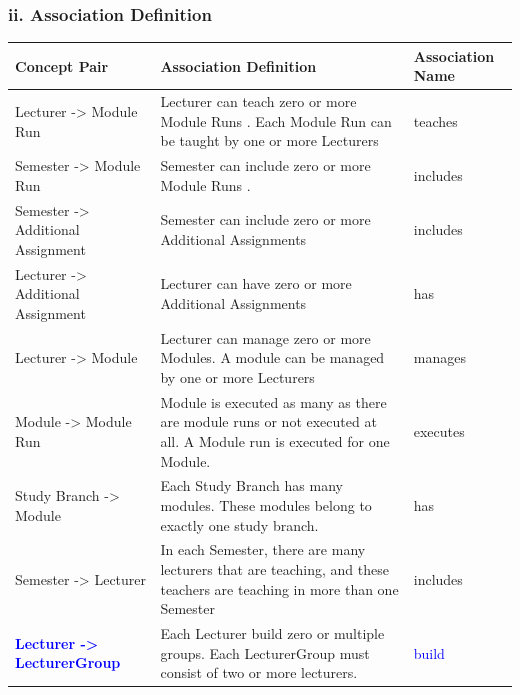 \documentclass{scrartcl}
\begin{document}
   
\subsubsection{ii. Association Definition}
	    \begin{table}[H]
\begin{center}
\begin{tabular}{| p{6.5cm}| p{6.5cm} |p{2.5cm}|}

\hline
\rowcolor{LightCyan}
\textbf{Concept Pair} & \textbf{Association Definition}& \textbf{Association Name} \\
\hline
Lecturer -> Module Run                    &    Lecturer can teach zero or        more Module Runs . Each Module Run can be taught by  one or more Lecturers 	& teaches\\ \hline

Semester -> Module Run                    &      Semester can include zero or more Module Runs  .    	& includes\\ \hline

Semester -> Additional Assignment     &     Semester can include zero or more Additional Assignments      & includes\\ \hline

Lecturer -> Additional Assignment                    &    Lecturer can have zero or more Additional Assignments 	& has\\ \hline

Lecturer -> Module                    &             Lecturer can manage zero or more Modules. A module can be managed by one or more Lecturers	& manages\\ \hline

Module -> Module Run                    &    Module is executed as many
as there are module runs or not executed at all.
A Module run is executed for one Module.& executes \\ \hline

Study Branch -> Module                    &   Each Study Branch has many modules. These modules belong to exactly one study branch.  & has\\ \hline
  Semester -> Lecturer                  &      In each Semester, there are many lecturers that are teaching, and these teachers are teaching in more than one Semester       & includes\\ \hline
 

 

 
 \textbf{\textcolor{blue}{ Lecturer -> LecturerGroup}}  & 
 Each Lecturer build  zero or multiple groups. 
 Each LecturerGroup must consist of two or more lecturers. & \textcolor{blue}{build}\\ \hline
 

\end{tabular}
\end{center}
\end{table}
\end{document}
